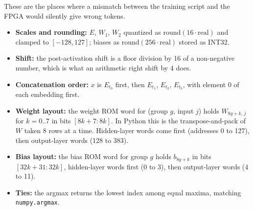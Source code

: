 \documentclass[10pt,a4paper]{article}
\begin{document}
These are the places where a mismatch between the training script and the FPGA would silently give wrong tokens.
\begin{itemize}
\item \textbf{Scales and rounding:} $E$, $W_1$, $W_2$ quantized as $\mathrm{round}(16\cdot\text{real})$ and clamped to $[-128,127]$; biases as $\mathrm{round}(256\cdot\text{real})$ stored as INT32.
\item \textbf{Shift:} the post-activation shift is a floor division by 16 of a non-negative number, which is what an arithmetic right shift by 4 does.
\item \textbf{Concatenation order:} $x$ is $E_{t_0}$ first, then $E_{t_1}$, $E_{t_2}$, $E_{t_3}$, with element 0 of each embedding first.
\item \textbf{Weight layout:} the weight ROM word for (group $g$, input $j$) holds $W_{8g+k,\,j}$ for $k=0..7$ in bits $[8k+7:8k]$. In Python this is the transpose-and-pack of $W$ taken 8 rows at a time. Hidden-layer words come first (addresses 0 to 127), then output-layer words (128 to 383).
\item \textbf{Bias layout:} the bias ROM word for group $g$ holds $b_{8g+k}$ in bits $[32k+31:32k]$, hidden-layer words first (0 to 3), then output-layer words (4 to 11).
\item \textbf{Ties:} the argmax returns the lowest index among equal maxima, matching \texttt{numpy.argmax}.
\end{itemize}
\end{document}

